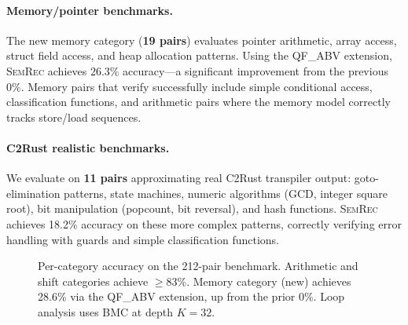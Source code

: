 \documentclass[11pt]{article}
\newcommand{\semrec}{\textsc{SemRec}}
\begin{document}
\paragraph{Memory/pointer benchmarks.}
The new memory category (\textbf{19 pairs}) evaluates pointer arithmetic,
array access, struct field access, and heap allocation patterns.  Using
the QF\_ABV extension, \semrec{} achieves 26.3\% accuracy---a significant
improvement from the previous 0\%.  Memory pairs that verify successfully
include simple conditional access, classification functions, and arithmetic
pairs where the memory model correctly tracks store/load sequences.

\paragraph{C2Rust realistic benchmarks.}
We evaluate on \textbf{11 pairs} approximating real C2Rust transpiler output:
goto-elimination patterns, state machines, numeric algorithms (GCD, integer
square root), bit manipulation (popcount, bit reversal), and hash functions.
\semrec{} achieves 18.2\% accuracy on these more complex patterns, correctly
verifying error handling with guards and simple classification functions.

\begin{figure}[t]
\centering
{}
\caption{Per-category accuracy on the 212-pair benchmark.  Arithmetic and
         shift categories achieve $\geq$83\%.  Memory category (new)
         achieves 28.6\% via the QF\_ABV extension, up from the prior 0\%.
         Loop analysis uses BMC at depth $K{=}32$.}\label{fig:bench-bar}
\end{figure}
\end{document}
